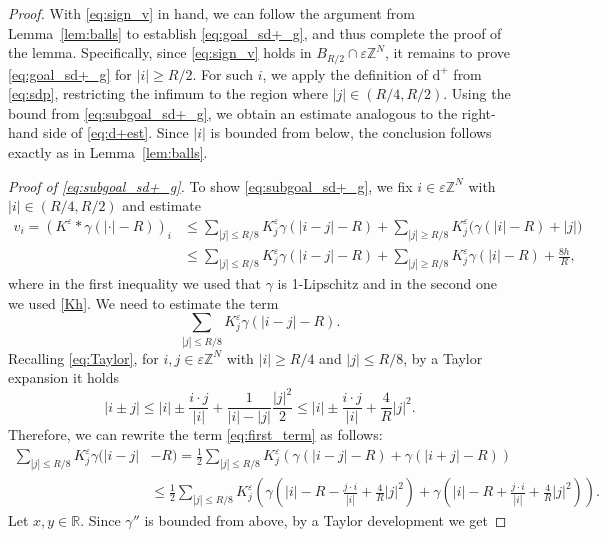 \documentclass[10pt]{amsart}
\theoremstyle{plain}
\theoremstyle{definition}
\newcommand{\R}{\mathbb{R}}
\newcommand{\Z}{\mathbb{Z}}
\newcommand{\g}{\gamma}
\newcommand{\e}{\varepsilon}
\newcommand{\ez}{\e\Z^N}
\numberwithin{equation}{section}
\begin{document}
\begin{proof}
With \eqref{eq:sign_v} in hand, we can  follow the argument from Lemma~\ref{lem:balls} to establish \eqref{eq:goal_sd+_g}, and thus complete the proof of the lemma. Specifically, since \eqref{eq:sign_v} holds in $B_{R/2}\cap \ez$, it remains to prove \eqref{eq:goal_sd+_g} for $|i| \ge R/2$. For such $i$, we apply the definition of $\text{d}^+$ from \eqref{eq:sdp}, restricting the infimum to the region where $|j| \in (R/4, R/2)$. Using the bound from \eqref{eq:subgoal_sd+_g}, we obtain an estimate analogous to the right-hand side of \eqref{eq:d+est}. Since $|i|$ is bounded from below, the conclusion follows exactly as in Lemma~\ref{lem:balls}.



\noindent\textit{Proof of \eqref{eq:subgoal_sd+_g}.} To show \eqref{eq:subgoal_sd+_g}, we fix $i\in\ez$ with $|i|\in (R/4,R/2)$  and  estimate 
\begin{equation}
    \begin{split}\label{eq:est_v_g}
    v_i=(K^\e\ast \g(|\cdot|-R))_i &\le  \sum_{|j|\le R/8} K^\e_j \g(|i-j|-R) +  \sum_{|j|\ge R/8} K^\e_j  \Big( \g(|i|-R)+|j|\Big) \\
    &\le \sum_{|j|\le R/8} K^\e_j \g(|i-j|-R) +  \sum_{|j|\ge R/8} K^\e_j \g(|i|-R) +\tfrac {8h}{R},
    \end{split}
\end{equation}
where  in the first inequality we used that $\g$ is 1-Lipschitz and in the second one we used \eqref{Kh}. We need to estimate the term
\begin{equation}\label{eq:first_term}
    \sum_{|j|\le R/8} K^\e_j \g(|i-j|-R).
\end{equation}
Recalling \eqref{eq:Taylor}, for $i,j\in\ez$ with  $|i|\ge R/4$ and $|j|\le R/8$,   {by a Taylor expansion} it holds 
\[
    |i\pm j|\le |i| \pm \frac{i\cdot j}{|i|} + \frac1{|i|-|j|}\frac{|j|^2}2 \le |i| \pm \frac{i\cdot j}{|i|} + \frac 4R |j|^2.
\] 
Therefore, we  can rewrite the term \eqref{eq:first_term} as follows:
\begin{equation}
    \begin{split}
        \sum_{|j|\le R/8} K^\e_j \g(|i-j|&-R) =\frac 12  \sum_{|j|\le R/8} K^\e_j (\g(|i-j|-R) +\g(|i+j|-R) ) \\
    &\le \frac 12  \sum_{|j|\le R/8} K^\e_j (\g(|i|-R -\tfrac{j\cdot i}{|i|} + \tfrac{4}{R} |j|^2 ) +\g(|i|-R+\tfrac{j\cdot i}{|i|} + \tfrac{4}{R}|j|^2) ).\label{eq:mult_g}
    \end{split}
\end{equation}
Let $x,y\in \R$. Since $\g''$ is bounded from above, by a Taylor development we get 

\end{proof}
\end{document}
